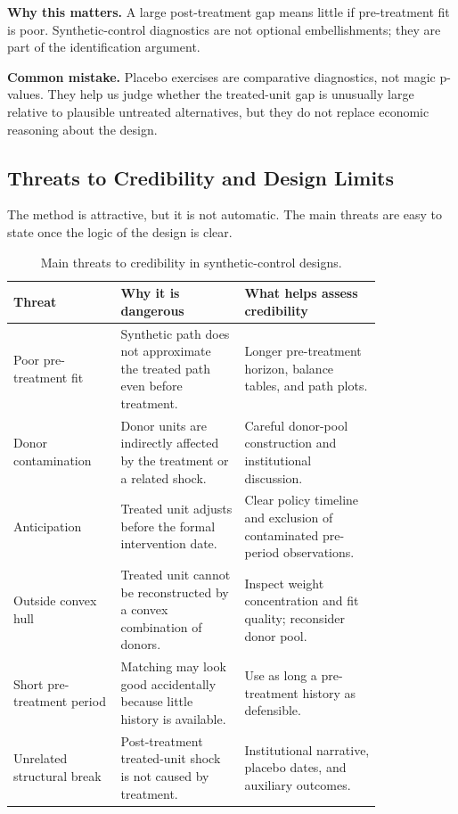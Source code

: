 \begin{boxD}
\textbf{Why this matters.}
A large post-treatment gap means little if pre-treatment fit is poor. Synthetic-control diagnostics are not optional embellishments; they are part of the identification argument.
\end{boxD}

\begin{boxF}
\textbf{Common mistake.}
Placebo exercises are comparative diagnostics, not magic p-values. They help us judge whether the treated-unit gap is unusually large relative to plausible untreated alternatives, but they do not replace economic reasoning about the design.
\end{boxF}

\subsection{Threats to Credibility and Design Limits}
The method is attractive, but it is not automatic. The main threats are easy to state once the logic of the design is clear.

\begin{table}[h]
\centering
\small
\begin{tabular}{p{0.23\linewidth}p{0.28\linewidth}p{0.31\linewidth}}
\toprule
Threat & Why it is dangerous & What helps assess credibility \\
\midrule
Poor pre-treatment fit & Synthetic path does not approximate the treated path even before treatment. & Longer pre-treatment horizon, balance tables, and path plots. \\
Donor contamination & Donor units are indirectly affected by the treatment or a related shock. & Careful donor-pool construction and institutional discussion. \\
Anticipation & Treated unit adjusts before the formal intervention date. & Clear policy timeline and exclusion of contaminated pre-period observations. \\
Outside convex hull & Treated unit cannot be reconstructed by a convex combination of donors. & Inspect weight concentration and fit quality; reconsider donor pool. \\
Short pre-treatment period & Matching may look good accidentally because little history is available. & Use as long a pre-treatment history as defensible. \\
Unrelated structural break & Post-treatment treated-unit shock is not caused by treatment. & Institutional narrative, placebo dates, and auxiliary outcomes. \\
\bottomrule
\end{tabular}
\caption{Main threats to credibility in synthetic-control designs.}
\label{tab:sc_threats}
\end{table}

